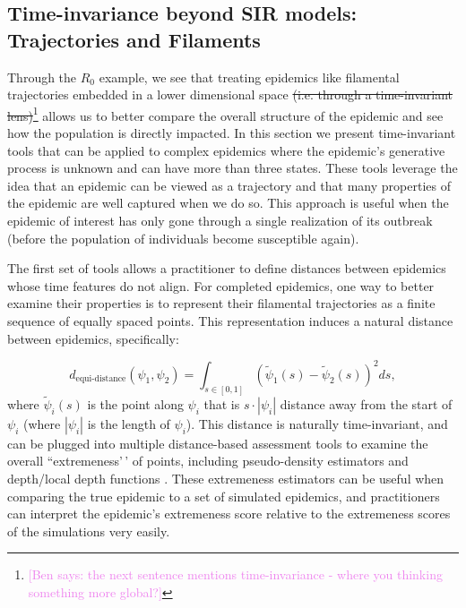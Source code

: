 \documentclass[
  shortnames]{jss}
\begin{document}
\hypertarget{time-invariance-beyond-sir-models-trajectories-and-filaments}{%
\subsection{Time-invariance beyond SIR models: Trajectories and
Filaments}\label{time-invariance-beyond-sir-models-trajectories-and-filaments}}

Through the \(R_0\) example, we see that treating epidemics like
filamental trajectories embedded in a lower dimensional space
\sout{(i.e. through a time-invariant lens)}\footnote{\textcolor{violet}{[Ben says: the next sentence mentions time-invariance - where you thinking something more global?]}}
allows us to better compare the overall structure of the epidemic and
see how the population is directly impacted. In this section we present
time-invariant tools that can be applied to complex epidemics where the
epidemic's generative process is unknown and can have more than three
states. These tools leverage the idea that an epidemic can be viewed as
a trajectory and that many properties of the epidemic are well captured
when we do so. This approach is useful when the epidemic of interest has
only gone through a single realization of its outbreak (before the
population of individuals become susceptible again).

The first set of tools allows a practitioner to define distances between
epidemics whose time features do not align. For completed epidemics, one
way to better examine their properties is to represent their filamental
trajectories as a finite sequence of equally spaced points. This
representation induces a natural distance between epidemics,
specifically:

\[
d_\text{equi-distance}(\psi_1, \psi_2)  = \int_{s \in [0,1]} (\tilde{\psi}_1(s) - \tilde{\psi}_2(s))^2 ds \nonumber,
\] where \(\tilde{\psi}_i(s)\) is the point along \(\psi_i\) that is
\(s\cdot|\psi_i|\) distance away from the start of \(\psi_i\) (where
\(|\psi_i|\) is the length of \(\psi_i\)). This distance is naturally
time-invariant, and can be plugged into multiple distance-based
assessment tools to examine the overall ``extremeness'\,' of points,
including pseudo-density estimators and depth/local depth functions
\citep[for examples see][]{Ciollaro2016, Geenens2017}. These extremeness
estimators can be useful when comparing the true epidemic to a set of
simulated epidemics, and practitioners can interpret the epidemic's
extremeness score relative to the extremeness scores of the simulations
very easily.
\end{document}
